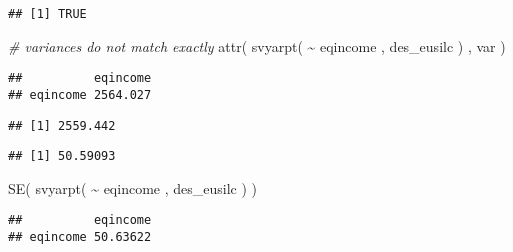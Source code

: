 \documentclass[
]{book}
\newenvironment{Shaded}{\begin{snugshade}}{\end{snugshade}}
\newcommand{\CommentTok}[1]{\textcolor[rgb]{0.56,0.35,0.01}{\textit{#1}}}
\newcommand{\FunctionTok}[1]{\textcolor[rgb]{0.00,0.00,0.00}{#1}}
\newcommand{\NormalTok}[1]{#1}
\newcommand{\SpecialCharTok}[1]{\textcolor[rgb]{0.00,0.00,0.00}{#1}}
\newcommand{\StringTok}[1]{\textcolor[rgb]{0.31,0.60,0.02}{#1}}
\begin{document}
\begin{verbatim}
## [1] TRUE
\end{verbatim}

\begin{Shaded}
\begin{Highlighting}[]
\CommentTok{\# variances do not match exactly}
\FunctionTok{attr}\NormalTok{( }\FunctionTok{svyarpt}\NormalTok{( }\SpecialCharTok{\textasciitilde{}}\NormalTok{ eqincome , des\_eusilc ) , }\StringTok{\textquotesingle{}var\textquotesingle{}}\NormalTok{ )}
\end{Highlighting}
\end{Shaded}

\begin{verbatim}
##          eqincome
## eqincome 2564.027
\end{verbatim}

\begin{Shaded}
\end{Shaded}

\begin{verbatim}
## [1] 2559.442
\end{verbatim}

\begin{Shaded}
\end{Shaded}

\begin{verbatim}
## [1] 50.59093
\end{verbatim}

\begin{Shaded}
\begin{Highlighting}[]
\FunctionTok{SE}\NormalTok{( }\FunctionTok{svyarpt}\NormalTok{( }\SpecialCharTok{\textasciitilde{}}\NormalTok{ eqincome , des\_eusilc ) )}
\end{Highlighting}
\end{Shaded}

\begin{verbatim}
##          eqincome
## eqincome 50.63622
\end{verbatim}
\end{document}
